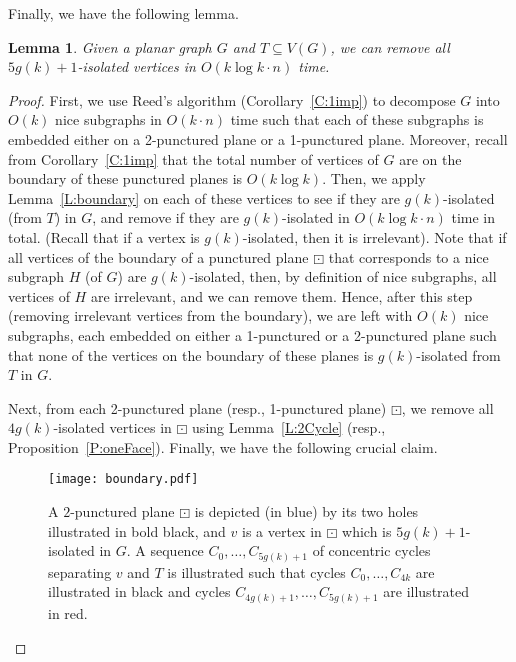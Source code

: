 \documentclass{article}
\newtheorem{lemma}[theorem]{Lemma}
\numberwithin{claimcounter}{lemma}
\begin{document}
Finally, we have the following lemma.
\begin{lemma}\label{L:fin}
    Given a planar graph $G$ and $T\subseteq V(G)$, we can remove all $5g(k)+1$-isolated vertices in $O(k\log k \cdot n)$ time. 
\end{lemma}
\begin{proof}
    First, we use Reed's algorithm (Corollary~\ref{C:1imp}) to decompose $G$ into $O(k)$ nice subgraphs in $O(k \cdot n)$ time such that each of these subgraphs is embedded either on a 2-punctured plane or a 1-punctured plane. Moreover, recall from Corollary~\ref{C:1imp} that the total number of vertices of $G$ are on the boundary of these punctured planes is $O(k\log k)$. Then, we apply Lemma~\ref{L:boundary} on each of these vertices to see if they are $g(k)$-isolated (from $T$) in $G$, and remove  if they are $g(k)$-isolated in $O ( k \log k\cdot n)$ time in total. (Recall that if a vertex is $g(k)$-isolated, then it is irrelevant). Note that if all vertices of the boundary of a punctured plane $\boxdot$ that corresponds to a nice subgraph $H$ (of $G$) are $g(k)$-isolated, then, by definition of nice subgraphs, all vertices of $H$ are irrelevant, and we can remove them. Hence, after this step (removing irrelevant vertices from the boundary), we are left with $O(k)$ nice subgraphs, each embedded on either a 1-punctured or a 2-punctured plane such that none of the vertices on the boundary of these planes is $g(k)$-isolated from $T$ in $G$.

    Next, from each 2-punctured plane (resp., 1-punctured plane)  $\boxdot$, we remove all $4g(k)$-isolated vertices in $\boxdot$ using Lemma~\ref{L:2Cycle} (resp., Proposition~\ref{P:oneFace}). Finally, we have the following crucial claim.

\begin{figure}
    \centering
    \texttt{[image: boundary.pdf]}
    \caption{A $2$-punctured plane $\boxdot$ is depicted (in blue) by its two holes illustrated in bold black, and $v$ is a vertex in $\boxdot$ which is $5g(k)+1$-isolated in $G$.  A sequence $C_0,\ldots,C_{5g(k)+1}$ of concentric cycles separating $v$ and $T$ is illustrated such that cycles $C_0,\ldots,C_{4k}$ are illustrated in black and cycles $C_{4g(k)+1},\ldots,C_{5g(k)+1}$ are illustrated in red.}
    \label{fig:C38}
\end{figure}
    

\end{proof}
\end{document}
